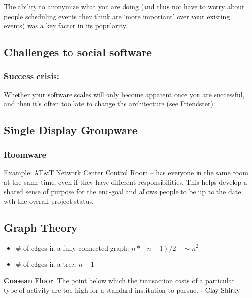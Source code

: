 The ability to anonymize what you are doing (and thus not have to worry about people scheduling events they think are `more important' over your existing events) was a key factor in its popularity.


\subsection{Challenges to social software}
\subsubsection{Success crisis:}
\begin{shaded}
    Whether your software scales will only become apparent once you are successful, and then it’s often too late to change the architecture (see Friendster)
\end{shaded}

\subsection{Single Display Groupware}
\subsubsection{Roomware}
Example: AT\&T Network Center Control Room -- has everyone in the same room at the same time, even if they have different responsibilities. This helps develop a shared sense of purpose for the end-goal and allows people to be up to the date wth the overall project status.

\subsection{Graph Theory}
\begin{itemize}
    \item  \# of edges in a fully connected graph: $n*(n-1)/2 \quad\sim n^2$
    \item \# of edges in a tree: $n-1$
\end{itemize}

\begin{shaded}
    \textbf{Coasean Floor}: The point below which the transaction costs of a particular type of activity are too high for a standard institution to pursue.
    $\hfill\text{- Clay Shirky}$
\end{shaded}

